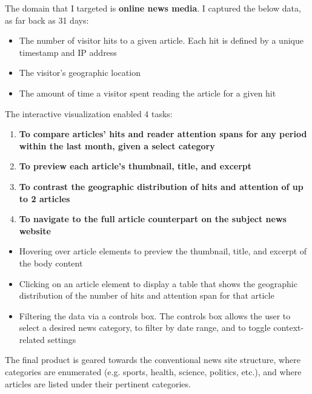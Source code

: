 \documentclass[12pt]{article}
\begin{document}
\newpage

The domain that I targeted is \textbf{online news media}. I captured the below data, as far back as 31 days:
\begin{itemize}
\item The number of visitor hits to a given article. Each hit is defined by a unique timestamp and IP address
\item The visitor's geographic location
\item The amount of time a visitor spent reading the article for a given hit
\end{itemize}


\noindent The interactive visualization enabled 4 tasks:
\begin{enumerate}
\item \textbf{To compare articles' hits and reader attention spans for any period within the last month, given a select category}
\item \textbf{To preview each article's thumbnail, title, and excerpt}
\item \textbf{To contrast the geographic distribution of hits and attention of up to 2 articles}
\item \textbf{To navigate to the full article counterpart on the subject news website}
\end{enumerate}

\begin{itemize}
\item Hovering over article elements to preview the thumbnail, title, and excerpt of the body content
\item Clicking on an article element to display a table that shows the geographic distribution of the number of hits and attention span for that article
\item Filtering the data via a controls box. The controls box allows the user to select a desired news category, to filter by date range, and to toggle context-related settings 
\end{itemize}

The final product is geared towards the conventional news site structure, where categories are enumerated (e.g. sports, health, science, politics, etc.), and where articles are listed under their pertinent categories. \\
\end{document}
